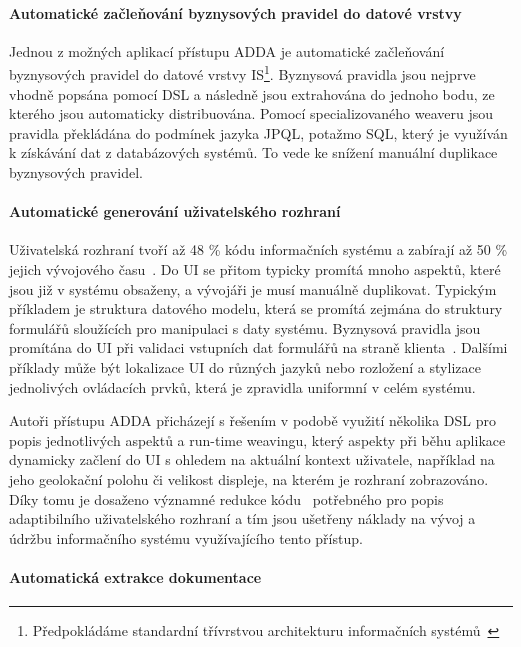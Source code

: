\paragraph{Automatické začleňování byznysových pravidel do datové vrstvy}

Jednou z možných aplikací přístupu \gls{ADDA} je automatické začleňování
byznysových pravidel do datové vrstvy \gls{IS}\footnote{Předpokládáme standardní
třívrstvou architekturu informačních systémů~\cite{fowler2002patterns}}.
Byznysová pravidla jsou nejprve vhodně popsána pomocí \gls{DSL} a následně jsou
extrahována do jednoho bodu, ze kterého jsou automaticky distribuována.
Pomocí specializovaného weaveru jsou pravidla překládána do podmínek
jazyka \gls{JPQL}, potažmo \gls{SQL}, který je využíván k získávání dat
z databázových systémů. To vede ke snížení manuální duplikace byznysových
pravidel.

\paragraph{Automatické generování uživatelského rozhraní}

Uživatelská rozhraní tvoří až 48 \% kódu informačních systému
a zabírají až 50 \% jejich vývojového času~\cite{kennard2009separation}.
Do \gls{UI} se přitom typicky promítá mnoho aspektů, které jsou
již v systému obsaženy, a vývojáři je musí manuálně duplikovat.
Typickým příkladem je struktura datového modelu, která se promítá
zejmána do struktury formulářů sloužících pro manipulaci s daty systému.
Byznysová pravidla jsou promítána do \gls{UI} při validaci vstupních
dat formulářů na straně klienta~\cite{cemus2017separation}.
Dalšími příklady může být lokalizace \gls{UI} do různých jazyků
nebo rozložení a stylizace jednolivých ovládacích prvků, která
je zpravidla uniformní v celém systému.

Autoři přístupu \gls{ADDA} přicházejí s řešením v podobě
využití několika \gls{DSL} pro popis jednotlivých aspektů
a run-time weavingu, který aspekty při běhu aplikace
dynamicky začlení do \gls{UI} s ohledem na aktuální kontext
uživatele, například na jeho geolokační polohu či velikost
displeje, na kterém je rozhraní zobrazováno.
Díky tomu je dosaženo významné redukce kódu~\cite{cemus2016context}
potřebného pro popis adaptibilního uživatelského rozhraní
a tím jsou ušetřeny náklady na vývoj a údržbu informačního
systému využívajícího tento přístup.

\paragraph{Automatická extrakce dokumentace}

